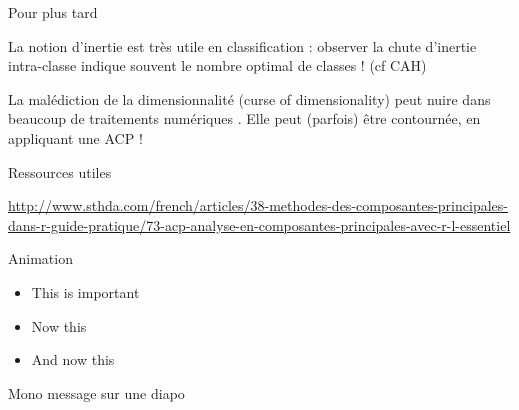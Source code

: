 \documentclass{beamer}
\begin{document}
\begin{frame}{Pour plus tard}


La notion d'\alert{inertie} est très utile en classification : observer la chute d'inertie intra-classe indique souvent le nombre optimal de classes ! (cf CAH)



La \alert{malédiction de la dimensionnalité} (curse of dimensionality) peut nuire dans beaucoup de traitements numériques . Elle peut (parfois) être contournée, en appliquant une ACP !




\end{frame}




\begin{frame}{Ressources utiles}


\url{http://www.sthda.com/french/articles/38-methodes-des-composantes-principales-dans-r-guide-pratique/73-acp-analyse-en-composantes-principales-avec-r-l-essentiel}

\end{frame}


\begin{frame}{Animation}
  \begin{itemize}[<+- | alert@+>]
    \item \alert<4>{This is important}
    \item Now this
    \item And now this
  \end{itemize}
\end{frame}



\begin{frame}[standout]
Mono message sur une diapo
\end{frame}
\end{document}
